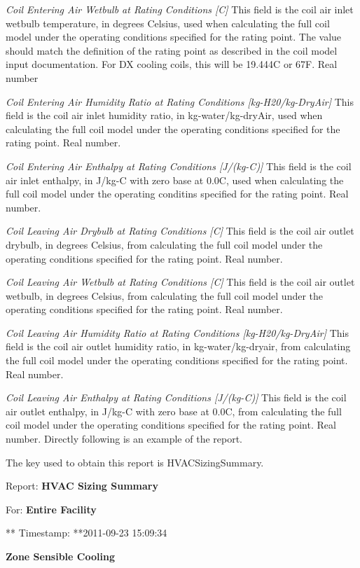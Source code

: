 \emph{Coil Entering Air Wetbulb at Rating Conditions [C]}  This field is the coil air inlet wetbulb temperature, in degrees Celsius, used when calculating the full coil model under the operating conditions specified for the rating point.  The value should match the definition of the rating point as described in the coil model input documentation.  For DX cooling coils, this will be 19.444C or 67F. Real number

\emph{Coil Entering Air Humidity Ratio at Rating Conditions [kg-H20/kg-DryAir]}  This field is the coil air inlet humidity ratio, in kg-water/kg-dryAir, used when calculating the full coil model under the operating conditions specified for the rating point.  Real number.

\emph{Coil Entering Air Enthalpy at Rating Conditions [J/(kg-C)]}  This field is the coil air inlet enthalpy, in J/kg-C with zero base at 0.0C, used when calculating the full coil model under the operating conditins specified for the rating point. Real number.

\emph{Coil Leaving Air Drybulb at Rating Conditions [C]}  This field is the coil air outlet drybulb, in degrees Celsius, from calculating the full coil model under the operating conditions specified for the rating point. Real number.

\emph{Coil Leaving Air Wetbulb at Rating Conditions [C]}  This field is the coil air outlet wetbulb, in degrees Celsius, from calculating the full coil model under the operating conditions specified for the rating point. Real number.

\emph{Coil Leaving Air Humidity Ratio at Rating Conditions [kg-H20/kg-DryAir]}  This field is the coil air outlet humidity ratio, in kg-water/kg-dryair, from calculating the full coil model under the operating conditions specified for the rating point. Real number.

\emph{Coil Leaving Air Enthalpy at Rating Conditions [J/(kg-C)]} This field is the coil air outlet enthalpy, in J/kg-C with zero base at 0.0C, from calculating the full coil model under the operating conditions specified for the rating point. Real number.
Directly following is an example of the report.

The key used to obtain this report is HVACSizingSummary.

Report: \textbf{HVAC Sizing Summary}

For: \textbf{Entire Facility}

** Timestamp: **2011-09-23 15:09:34

\textbf{Zone Sensible Cooling}

